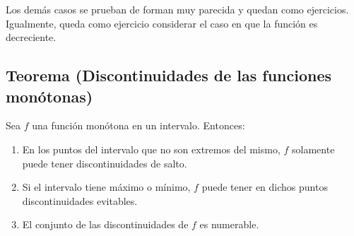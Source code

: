\documentclass[10pt,a4paper]{article}
\begin{document}
	Los demás casos se prueban de forman muy parecida y quedan como ejercicios. Igualmente, queda como ejercicio considerar el caso en que la función es decreciente.
	
	\subsection{Teorema (Discontinuidades de las funciones monótonas)}
	Sea $f$ una función monótona en un intervalo. Entonces:
	\begin{enumerate}[label = \roman*)]
		\item En los puntos del intervalo que no son extremos del mismo, $f$ solamente puede tener discontinuidades de salto.
		\item Si el intervalo tiene máximo o mínimo, $f$ puede tener en dichos puntos discontinuidades evitables.
		\item El conjunto de las discontinuidades de $f$ es numerable.
	\end{enumerate}
	
\end{document}
